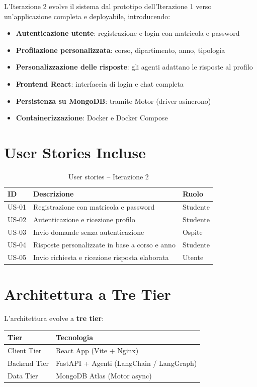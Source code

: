 \documentclass[a4paper,12pt]{report}
\begin{document}
L'Iterazione 2 evolve il sistema dal prototipo dell'Iterazione 1 verso un'applicazione completa e deployabile, introducendo:
\begin{itemize}
    \item \textbf{Autenticazione utente}: registrazione e login con matricola e password
    \item \textbf{Profilazione personalizzata}: corso, dipartimento, anno, tipologia
    \item \textbf{Personalizzazione delle risposte}: gli agenti adattano le risposte al profilo
    \item \textbf{Frontend React}: interfaccia di login e chat completa
    \item \textbf{Persistenza su MongoDB}: tramite Motor (driver asincrono)
    \item \textbf{Containerizzazione}: Docker e Docker Compose
\end{itemize}

\section{User Stories Incluse}

\begin{table}[H]
\centering
\begin{tabularx}{\textwidth}{l X l}
\toprule
\textbf{ID} & \textbf{Descrizione} & \textbf{Ruolo} \\
\midrule
US-01 & Registrazione con matricola e password & Studente \\
US-02 & Autenticazione e ricezione profilo & Studente \\
US-03 & Invio domande senza autenticazione & Ospite \\
US-04 & Risposte personalizzate in base a corso e anno & Studente \\
US-05 & Invio richiesta e ricezione risposta elaborata & Utente \\
\bottomrule
\end{tabularx}
\caption{User stories -- Iterazione 2}
\end{table}

\section{Architettura a Tre Tier}

L'architettura evolve a \textbf{tre tier}:

\begin{table}[H]
\centering
\begin{tabularx}{\textwidth}{l X}
\toprule
\textbf{Tier} & \textbf{Tecnologia} \\
\midrule
Client Tier & React App (Vite + Nginx) \\
Backend Tier & FastAPI + Agenti (LangChain / LangGraph) \\
Data Tier & MongoDB Atlas (Motor async) \\
\bottomrule
\end{tabularx}
\end{table}
\end{document}
